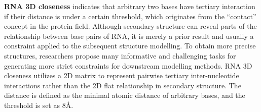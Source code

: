 \textbf{RNA 3D closeness} indicates that arbitrary two bases have tertiary interaction if their distance is under a certain threshold, which originates from the “contact” concept in the protein field.
Although secondary structure can reveal parts of the relationship between base pairs of RNA, it is merely a prior result and usually a constraint applied to the subsequent structure modelling. To obtain more precise structures, researchers propose many informative and challenging tasks for generating more strict constraints for downstream modelling methods.
RNA 3D closeness utilizes a 2D matrix to represent pairwise tertiary inter-nucleotide interactions rather than the 2D flat relationship in secondary structure. The distance is defined as the minimal atomic distance of arbitrary bases, and the threshold is set as 8\r{A}.

